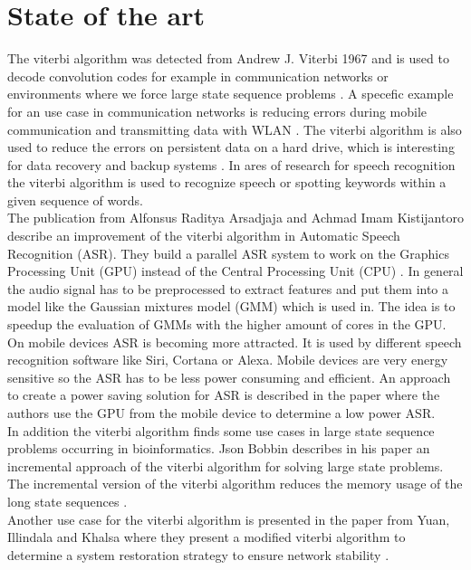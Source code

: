 \documentclass[12pt,journal,compsoc]{IEEEtran}
\begin{document}
\section{State of the art}
The viterbi algorithm was detected from Andrew J. Viterbi 1967\cite {wiki:viterbi} and is used to decode convolution codes for example in communication networks or environments where we force large state sequence problems \cite{wiki:viterbi}. A specefic example for an use case in communication networks is reducing errors during mobile communication and transmitting data with WLAN \cite{eetimes:viterbiWLAN}. The viterbi algorithm is also used to reduce the errors on persistent data on a hard drive, which is interesting for data recovery and backup systems \cite{journal:viterbiHardDrive}. In ares of research for speech recognition the viterbi algorithm is used to recognize speech or spotting keywords within a given sequence of words.\\
The publication from Alfonsus Raditya Arsadjaja and Achmad Imam Kistijantoro describe an improvement of the viterbi algorithm in Automatic Speech Recognition (ASR). They build a parallel ASR system to work on the Graphics Processing Unit (GPU) instead of the Central Processing Unit (CPU) \cite{article:Arsadjaja&Kistijantoro}. In general the audio signal has to be preprocessed to extract features and put them into a model like the Gaussian mixtures model (GMM) which is used in\cite{article:Arsadjaja&Kistijantoro}. The idea is to speedup the evaluation of GMMs with the higher amount of cores in the GPU.\\
On mobile devices ASR is becoming more attracted. It is used by different speech recognition software like Siri, Cortana or Alexa. Mobile devices are very energy sensitive so the ASR has to be less power consuming and efficient. An approach to create a power saving solution for ASR is described in the paper \cite{article:moblieGpu} where the authors use the GPU from the mobile device to determine a low power ASR.\\
In addition the viterbi algorithm finds some use cases in large state sequence problems occurring in bioinformatics. Json Bobbin describes in his paper an incremental approach of the viterbi algorithm for solving large state problems. The incremental version of the viterbi algorithm reduces the memory usage of the long state sequences \cite{article:bioinformatics}.\\
Another use case for the viterbi algorithm is presented in the paper from Yuan, Illindala and Khalsa where they present a modified viterbi algorithm to determine a system restoration strategy to ensure network stability \cite{article:gridResilience}.
\end{document}
